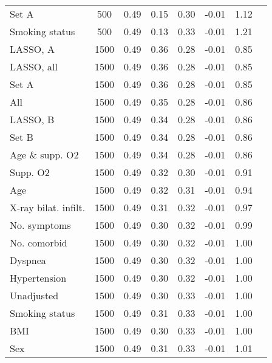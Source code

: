 \documentclass{article}
\begin{document}
{\begin{longtable}{lccccccc}
Set A & 500 & 0.49 & 0.15 & 0.30 & -0.01 & 1.12\\
Smoking status & 500 & 0.49 & 0.13 & 0.33 & -0.01 & 1.21\\ \midrule
LASSO, A & 1500 & 0.49 & 0.36 & 0.28 & -0.01 & 0.85\\
LASSO, all & 1500 & 0.49 & 0.36 & 0.28 & -0.01 & 0.85\\
Set A & 1500 & 0.49 & 0.36 & 0.28 & -0.01 & 0.85\\
All & 1500 & 0.49 & 0.35 & 0.28 & -0.01 & 0.86\\
LASSO, B & 1500 & 0.49 & 0.34 & 0.28 & -0.01 & 0.86\\
Set B & 1500 & 0.49 & 0.34 & 0.28 & -0.01 & 0.86\\
Age \& supp. O2 & 1500 & 0.49 & 0.34 & 0.28 & -0.01 & 0.86\\
Supp. O2 & 1500 & 0.49 & 0.32 & 0.30 & -0.01 & 0.91\\
Age & 1500 & 0.49 & 0.32 & 0.31 & -0.01 & 0.94\\
X-ray bilat. infilt. & 1500 & 0.49 & 0.31 & 0.32 & -0.01 & 0.97\\
No. symptoms & 1500 & 0.49 & 0.30 & 0.32 & -0.01 & 0.99\\
No. comorbid & 1500 & 0.49 & 0.30 & 0.32 & -0.01 & 1.00\\
Dyspnea & 1500 & 0.49 & 0.30 & 0.32 & -0.01 & 1.00\\
Hypertension & 1500 & 0.49 & 0.30 & 0.32 & -0.01 & 1.00\\
Unadjusted & 1500 & 0.49 & 0.30 & 0.33 & -0.01 & 1.00\\
Smoking status & 1500 & 0.49 & 0.31 & 0.33 & -0.01 & 1.00\\
BMI & 1500 & 0.49 & 0.30 & 0.33 & -0.01 & 1.00\\
Sex & 1500 & 0.49 & 0.31 & 0.33 & -0.01 & 1.01\\
\bottomrule
\hline
\end{longtable}
}

\clearpage
\end{document}
